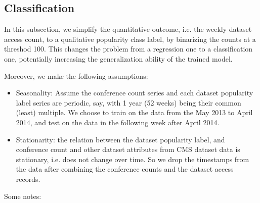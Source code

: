\documentclass[final, 12pt]{elsarticle}
\begin{document}
\subsection{Classification}

In this subsection, we simplify the quantitative outcome, i.e. the weekly dataset access count, to a qualitative popularity class label, by binarizing the counts at a threshod 100.
This changes the problem from a regression one to a classification one, potentially increasing the generalization ability of the trained model.


Moreover, we make the following assumptions:

\begin{itemize}
  
\item Seasonality:
Assume the conference count series and each dataset popularity label series are periodic, say, with 1 year (52 weeks) being their common (least)  multiple.
We choose to train on the data from the May 2013 to April 2014, and test on the data in the following week after April 2014.

\item Stationarity:
  the relation between the dataset popularity label,  and conference count and other dataset attributes from CMS dataset data is stationary, i.e. does not change over time. So we drop the timestamps from the data after combining the conference counts and the dataset access records.
  
\end{itemize}


Some notes:
\end{document}
